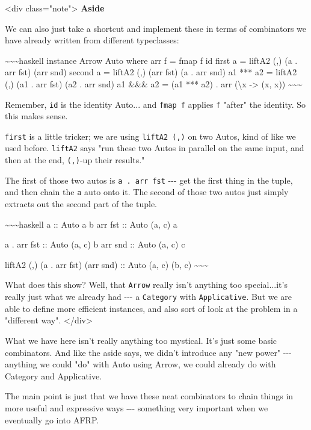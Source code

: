 \documentclass[]{article}
\begin{document}
\textless{}div class="note"\textgreater{} \textbf{Aside}

We can also just take a shortcut and implement these in terms of combinators we
have already written from different typeclasses:

\textasciitilde{}\textasciitilde{}\textasciitilde{}haskell instance Arrow Auto
where arr f = fmap f id first a = liftA2 (,) (a . arr fst) (arr snd) second a =
liftA2 (,) (arr fst) (a . arr snd) a1 *** a2 = liftA2 (,) (a1 . arr fst) (a2 .
arr snd) a1 \&\&\& a2 = (a1 *** a2) . arr (\textbackslash{}x -\textgreater{} (x,
x)) \textasciitilde{}\textasciitilde{}\textasciitilde{}

Remember, \texttt{id} is the identity Auto... and \texttt{fmap\ f} applies
\texttt{f} "after" the identity. So this makes sense.

\texttt{first} is a little tricker; we are using \texttt{liftA2\ (,)} on two
Autos, kind of like we used before. \texttt{liftA2} says "run these two Autos in
parallel on the same input, and then at the end, \texttt{(,)}-up their results."

The first of those two autos is \texttt{a\ .\ arr\ fst} -\/-\/- get the first
thing in the tuple, and then chain the \texttt{a} auto onto it. The second of
those two autos just simply extracts out the second part of the tuple.

\textasciitilde{}\textasciitilde{}\textasciitilde{}haskell a :: Auto a b arr fst
:: Auto (a, c) a

a . arr fst :: Auto (a, c) b arr snd :: Auto (a, c) c

liftA2 (,) (a . arr fst) (arr snd) :: Auto (a, c) (b, c)
\textasciitilde{}\textasciitilde{}\textasciitilde{}

What does this show? Well, that \texttt{Arrow} really isn't anything too
special...it's really just what we already had -\/-\/- a \texttt{Category} with
\texttt{Applicative}. But we are able to define more efficient instances, and
also sort of look at the problem in a "different way".
\textless{}/div\textgreater{}

What we have here isn't really anything too mystical. It's just some basic
combinators. And like the aside says, we didn't introduce any "new power"
-\/-\/- anything we could "do" with Auto using Arrow, we could already do with
Category and Applicative.

The main point is just that we have these neat combinators to chain things in
more useful and expressive ways -\/-\/- something very important when we
eventually go into AFRP.
\end{document}
